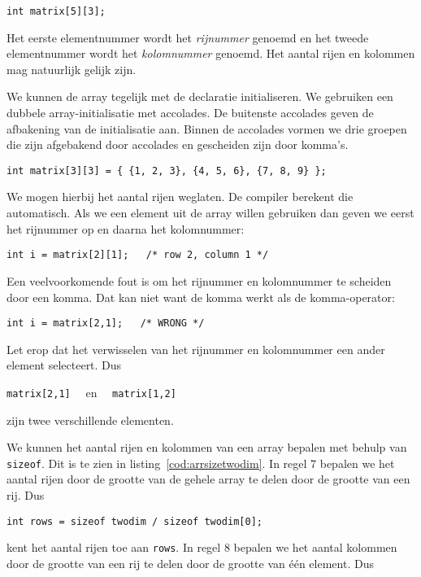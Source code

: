 \hspace*{1em}\texttt{int matrix[5][3];}

Het eerste elementnummer wordt het \textsl{rijnummer} genoemd en het tweede elementnummer wordt het \textsl{kolomnummer} genoemd. Het aantal rijen en kolommen mag natuurlijk gelijk zijn.

We kunnen de array tegelijk met de declaratie initialiseren. We gebruiken een dubbele array-initialisatie met accolades. De buitenste accolades geven de afbakening van de initialisatie aan. Binnen de accolades vormen we drie groepen die zijn afgebakend door accolades en gescheiden zijn door komma's.

\hspace*{1em}\texttt{int matrix[3][3] = \{ \{1, 2, 3\}, \{4, 5, 6\}, \{7, 8, 9\} \};}

We mogen hierbij het aantal rijen weglaten. De compiler berekent die automatisch. Als we een element uit de array willen gebruiken dan geven we eerst het rijnummer op en daarna het kolomnummer:

\hspace*{1em}\texttt{int i = matrix[2][1]; \ \ /* row 2, column 1 */}

Een veelvoorkomende fout is om het rijnummer en kolomnummer te scheiden door een komma. Dat kan niet want de komma werkt als de komma-operator:

\hspace*{1em}\texttt{int i = matrix[2,1]; \ \ /* WRONG */}

Let erop dat het verwisselen van het rijnummer en kolomnummer een ander element selecteert. Dus

\hspace*{1em}\texttt{matrix[2,1]} \ \ en \ \ \texttt{matrix[1,2]}

zijn twee verschillende elementen.

We kunnen het aantal rijen en kolommen van een array bepalen met behulp van \texttt{sizeof}. Dit is te zien in listing~\ref{cod:arrsizetwodim}.
In regel 7 bepalen we het aantal rijen door de grootte van de gehele array te delen door de grootte van een rij. Dus

\hspace*{1em}\texttt{int rows = sizeof twodim / sizeof twodim[0];}

kent het aantal rijen toe aan \texttt{rows}. In regel 8 bepalen we het aantal kolommen door de grootte van een rij te delen door de grootte van één element. Dus

